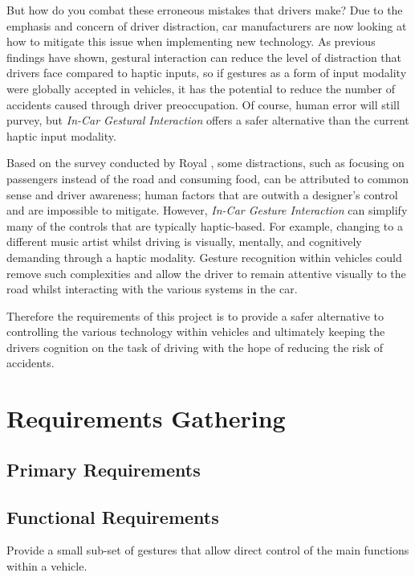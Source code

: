 \documentclass{l4proj}
\begin{document}
But how do you combat these erroneous mistakes that drivers make? Due to the emphasis and concern of  driver distraction, car manufacturers are now looking at how to mitigate this issue when implementing new technology. As previous findings have shown,\cite{345} gestural interaction can reduce the level of distraction that drivers face compared to haptic inputs, so if gestures as a form of input modality were globally accepted in vehicles, it has the potential to reduce the number of accidents caused through driver preoccupation. Of course, human error will still purvey, but {\it In-Car Gestural Interaction} offers a safer alternative than the current haptic input modality.

Based on the survey conducted by Royal \cite{Royal}, some distractions, such as focusing on passengers instead of the road and consuming food, can be attributed to common sense and driver awareness; human factors that are outwith a designer's control and are impossible to mitigate. However, {\it In-Car Gesture Interaction} can simplify many of the controls that are typically haptic-based. For example, changing to a different music artist whilst driving is visually, mentally, and cognitively demanding through a haptic modality. Gesture recognition within vehicles could remove such complexities and allow the driver to remain attentive visually to the road whilst interacting with the various systems in the car.   

Therefore the requirements of this project is to provide a safer alternative to controlling the various technology within vehicles and ultimately keeping the drivers cognition on the task of driving with the hope of reducing the risk of accidents.

\chapter{Requirements Gathering}
\label{sec:requirements}
\vspace{-3mm}
\section{Primary Requirements}
\vspace{-3mm}
\section{Functional Requirements}
\vspace{-3mm}

Provide a small sub-set of gestures that allow direct control of the main functions within a vehicle. 
\end{document}

